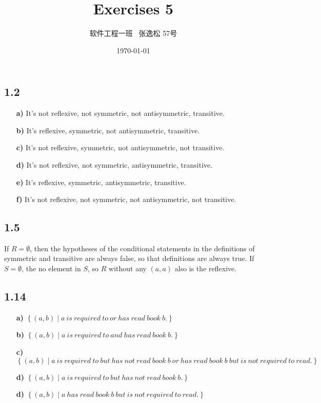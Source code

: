 \documentclass[10pt]{ctexart}
\title{Exercises 5}
\author{软件工程一班 \ 张逸松 57号}
\date{\today}
\begin{document}
    \maketitle
    \subsection*{1.2}
        \begin{itemize}
            \item [\textbf{a)}] It's not reflexive, not symmetric, not antisymmetric, transitive.
            \item [\textbf{b)}] It's reflexive, symmetric, not antisymmetric, transitive.
            \item [\textbf{c)}] It's not reflexive, symmetric, not antisymmetric, not transitive.
            \item [\textbf{d)}] It's not reflexive, not symmetric, antisymmetric, transitive.
            \item [\textbf{e)}] It's reflexive, symmetric, antisymmetric, transitive.
            \item [\textbf{f)}] It's not reflexive, not symmetric, not antisymmetric, not transitive.
        \end{itemize}
    \subsection*{1.5}
        If $R = \emptyset$, then the hypotheses of the conditional statements in the definitions of symmetric and transitive are always false, so that definitions are always true.
        If $S = \emptyset$, the no element in $S$, so $R$ without any $(a, a)$ also is the reflexive.
    \subsection*{1.14}
        \begin{itemize}
            \item [\textbf{a)}] $\left\{(a, b) \mid a \ is \ required \ to \ or \ has \ read \ book \ b. \right\}$
            \item [\textbf{b)}] $\left\{(a, b) \mid a \ is \ required \ to \ and \ has \ read \ book \ b. \right\}$
            \item [\textbf{c)}] $\left\{(a, b) \mid a \ is \ required \ to \ but \ has \ not \ read \ book \ b \ or \ has \ read \ book \ b \ but \ is \ not \ required \ to \ read. \right\}$
            \item [\textbf{d)}] $\left\{(a, b) \mid a \ is \ required \ to \ but \ has \ not \ read \ book \ b. \right\}$
            \item [\textbf{d)}] $\left\{(a, b) \mid a \ has \ read \ book \ b \ but \ is \ not \ required \ to \ read. \right\}$
        \end{itemize}
\end{document}
